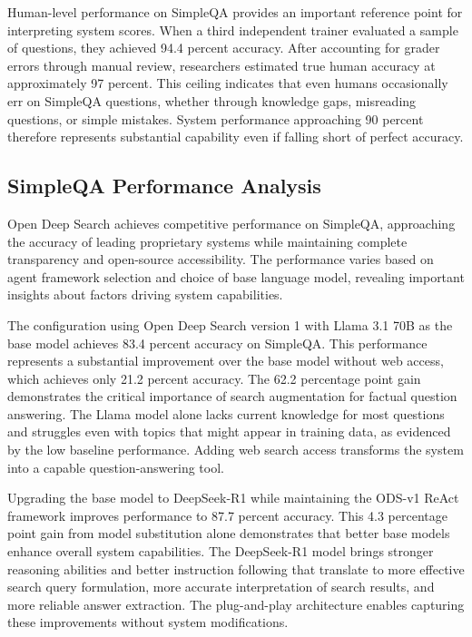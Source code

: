 Human-level performance on SimpleQA provides an important reference point for interpreting system scores. When a third independent trainer evaluated a sample of questions, they achieved 94.4 percent accuracy. After accounting for grader errors through manual review, researchers estimated true human accuracy at approximately 97 percent. This ceiling indicates that even humans occasionally err on SimpleQA questions, whether through knowledge gaps, misreading questions, or simple mistakes. System performance approaching 90 percent therefore represents substantial capability even if falling short of perfect accuracy.

\subsection{SimpleQA Performance Analysis}

Open Deep Search achieves competitive performance on SimpleQA, approaching the accuracy of leading proprietary systems while maintaining complete transparency and open-source accessibility. The performance varies based on agent framework selection and choice of base language model, revealing important insights about factors driving system capabilities.

The configuration using Open Deep Search version 1 with Llama 3.1 70B as the base model achieves 83.4 percent accuracy on SimpleQA. This performance represents a substantial improvement over the base model without web access, which achieves only 21.2 percent accuracy. The 62.2 percentage point gain demonstrates the critical importance of search augmentation for factual question answering. The Llama model alone lacks current knowledge for most questions and struggles even with topics that might appear in training data, as evidenced by the low baseline performance. Adding web search access transforms the system into a capable question-answering tool.

Upgrading the base model to DeepSeek-R1 while maintaining the ODS-v1 ReAct framework improves performance to 87.7 percent accuracy. This 4.3 percentage point gain from model substitution alone demonstrates that better base models enhance overall system capabilities. The DeepSeek-R1 model brings stronger reasoning abilities and better instruction following that translate to more effective search query formulation, more accurate interpretation of search results, and more reliable answer extraction. The plug-and-play architecture enables capturing these improvements without system modifications.

